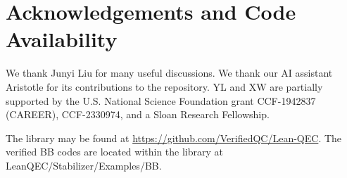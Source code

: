 \section{Acknowledgements and Code Availability}
\label{sec:acknowledgements}

We thank Junyi Liu for many useful discussions.
We thank our AI assistant Aristotle \cite{achim2025aristotle} for its contributions to the repository. YL and XW are partially supported by the U.S. National Science Foundation grant CCF-1942837 (CAREER), CCF-2330974, and a Sloan Research Fellowship. 

The library may be found at \hyperlink{https://github.com/VerifiedQC/Lean-QEC}{https://github.com/VerifiedQC/Lean-QEC}. The verified BB codes are located within the library at LeanQEC/Stabilizer/Examples/BB.

